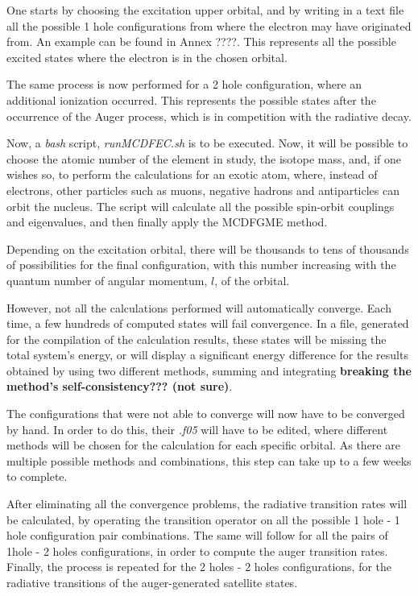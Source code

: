  One starts by choosing the excitation upper orbital, and by  writing in a text file all the possible 1 hole configurations from where the electron may have originated from. An example can be found in Annex ????. This represents all the possible excited states where the electron is in the chosen orbital.
 
 The same process is now performed for a 2 hole configuration, where an additional ionization occurred. This represents the possible states after the occurrence of the Auger process, which is in competition with the radiative decay.

 Now, a \textit{bash} script, \textit{runMCDFEC.sh} is to be executed. Now, it will be possible to choose the atomic number of the element in study, the isotope mass, and, if one wishes so, to perform the calculations for an exotic atom, where, instead of electrons, other particles such as muons, negative hadrons and antiparticles can orbit the nucleus. 
 The script will calculate all the possible spin-orbit couplings and eigenvalues, and then finally apply the \gls{MCDFGME} method.

 Depending on the excitation orbital, there will be thousands to tens of thousands of possibilities for the final configuration, with this number increasing with the quantum number of angular momentum, $l$, of the orbital.
 
 However, not all the calculations performed will automatically converge. Each time, a few hundreds of computed states will fail convergence. In a file, generated for the compilation of the calculation results, these states will be missing the total system's energy, or will display a significant energy difference for the results obtained by using two different methods, summing and integrating \textbf{breaking the method's self-consistency??? (not sure)}.

 The configurations that were not able to converge will now have to be converged by hand. In order to do this, their \textit{.f05} will have to be edited, where different methods will be chosen for the calculation for each specific orbital. As there are multiple possible methods and combinations, this step can take up to a few weeks to complete.

 After eliminating all the convergence problems, the radiative transition rates will be calculated, by operating the transition operator on all the possible 1 hole - 1 hole configuration pair combinations. The same will follow for all the pairs of 1hole - 2 holes configurations, in order to compute the auger transition rates. Finally, the process is repeated for the 2 holes - 2 holes configurations, for the radiative transitions of the auger-generated satellite states.


